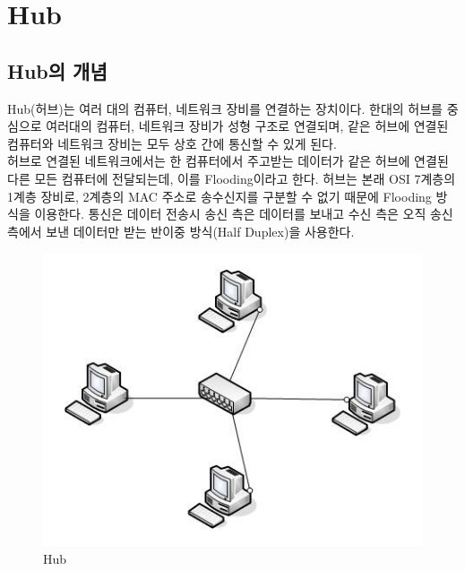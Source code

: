 \section{Hub}
\subsection{Hub의 개념}
    Hub(허브)는 여러 대의 컴퓨터, 네트워크 장비를 연결하는 장치이다. 한대의 허브를 중심으로 여러대의 컴퓨터, 네트워크 장비가 성형 구조로 연결되며, 같은 허브에 연결된 컴퓨터와 네트워크 장비는 모두 상호 간에 통신할 수 있게 된다. \\
    허브로 연결된 네트워크에서는 한 컴퓨터에서 주고받는 데이터가 같은 허브에 연결된 다른 모든 컴퓨터에 전달되는데, 이를 Flooding이라고 한다. 허브는 본래 OSI 7계층의 1계층 장비로, 2계층의 MAC 주소로 송수신지를 구분할 수 없기 때문에 Flooding 방식을 이용한다. 통신은 데이터 전송시 송신 측은 데이터를 보내고 수신 측은 오직 송신 측에서 보낸 데이터만 받는 반이중 방식(Half Duplex)을 사용한다. \\
    \vspace{-4mm}
    \begin{figure}[!h]\centering
		\includegraphics[width=.65\textwidth]{image/week05/3-1.png}
		\caption{\small Hub}
		\vspace{-10pt}
    \end{figure}
    
